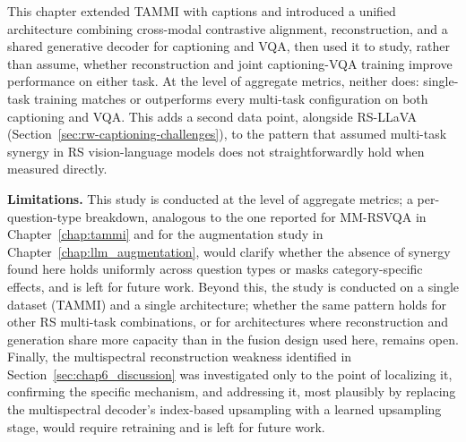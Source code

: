 This chapter extended TAMMI with captions and introduced a unified
architecture combining cross-modal contrastive alignment, reconstruction,
and a shared generative decoder for captioning and VQA, then used it to
study, rather than assume, whether reconstruction and joint
captioning-VQA training improve performance on either task. At the
level of aggregate metrics, neither does: single-task training matches
or outperforms every multi-task configuration on both captioning and
VQA. This adds a second data point, alongside RS-LLaVA
(Section~\ref{sec:rw-captioning-challenges}), to the pattern that assumed
multi-task synergy in RS vision-language models does not straightforwardly
hold when measured directly.

\textbf{Limitations.} This study is conducted at the level of aggregate
metrics; a per-question-type breakdown, analogous to the one reported
for MM-RSVQA in Chapter~\ref{chap:tammi} and for the augmentation study
in Chapter~\ref{chap:llm_augmentation}, would clarify whether the
absence of synergy found here holds uniformly across question types or
masks category-specific effects, and is left for future work. Beyond
this, the study is conducted on a single dataset (TAMMI) and a single
architecture; whether the same pattern holds for other RS multi-task
combinations, or for architectures where reconstruction and generation
share more capacity than in the fusion design used here, remains open.
Finally, the multispectral reconstruction weakness identified in
Section~\ref{sec:chap6_discussion} was investigated only to the point
of localizing it, confirming the specific
mechanism, and addressing it, most plausibly by replacing the 
multispectral decoder's index-based upsampling with a learned upsampling stage, 
would require retraining and is left for future work.